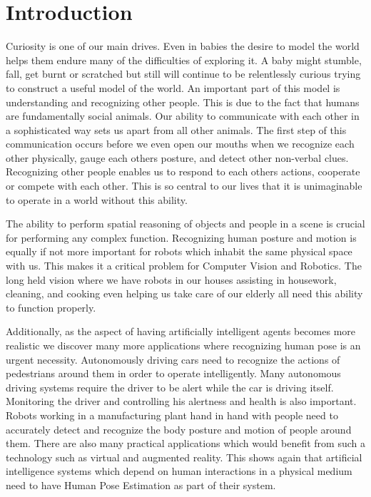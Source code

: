 
\chapter{Introduction}\label{chapter:introduction}

Curiosity is one of our main drives. Even in babies the desire to model the world helps them endure many of the difficulties of exploring it. A baby might stumble, fall, get burnt or scratched but still will continue to be relentlessly curious trying to construct a useful model of the world. An important part of this model is understanding and recognizing other people. This is due to the fact that humans are fundamentally social animals. Our ability to communicate with each other in a sophisticated way sets us apart from all other animals. The first step of this communication occurs before we even open our mouths when we recognize each other physically, gauge each others posture, and detect other non-verbal clues. Recognizing other people enables us to respond to each others actions, cooperate or compete with each other. This is so central to our lives that it is unimaginable to operate in a world without this ability. 

The ability to perform spatial reasoning of objects and people in a scene is crucial for performing any complex function. Recognizing human posture and motion is equally if not more important for robots which inhabit the same physical space with us. This makes it a critical problem for Computer Vision and Robotics. The long held vision where we have robots in our houses assisting in housework, cleaning, and cooking even helping us take care of our elderly all need this ability to function properly.

Additionally, as the aspect of having artificially intelligent agents becomes more realistic we discover many more applications where recognizing human pose is an urgent necessity. Autonomously driving cars need to recognize the actions of pedestrians around them in order to operate intelligently. Many autonomous driving systems require the driver to be alert while the car is driving itself. Monitoring the driver and controlling his alertness and health is also important. Robots working in a manufacturing plant hand in hand with people need to accurately detect and recognize the body posture and motion of people around them. There are also many practical applications which would benefit from such a technology such as virtual and augmented reality. This shows again that artificial intelligence systems which depend on human interactions in a physical medium need to have Human Pose Estimation as part of their system.

